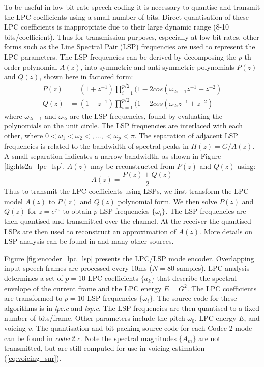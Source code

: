\documentclass{article}
\begin{document}
{To be useful in low bit rate speech coding it is necessary to quantise and transmit the LPC coefficients using a small number of bits. Direct quantisation of these LPC coefficients is inappropriate due to their large dynamic range (8-10 bits/coefficient). Thus for transmission purposes, especially at low bit rates, other forms such as the Line Spectral Pair (LSP) \cite{itakura1975line} frequencies are used to represent the LPC parameters. The LSP frequencies can be derived by decomposing the $p$-th order polynomial $A(z)$, into symmetric and anti-symmetric polynomials $P(z)$ and $Q(z)$, shown here in factored form:
\begin{equation}
\begin{split}
P(z) &= (1+z^{-1}) \prod_{i=1}^{p/2} (1 - 2cos(\omega_{2i-1} z^{-1} + z^{-2} ) \\
Q(z) &= (1-z^{-1}) \prod_{i=1}^{p/2} (1 - 2cos(\omega_{2i} z^{-1} + z^{-2} )
\end{split}
\end{equation}
where $\omega_{2i-1}$ and $\omega_{2i}$ are the LSP frequencies, found by evaluating the polynomials on the unit circle. The LSP frequencies are interlaced with each other, where $0<\omega_1 < \omega_2 <,..., < \omega_p < \pi$. The separation of adjacent LSP frequencies is related to the bandwidth of spectral peaks in $H(z)=G/A(z)$. A small separation indicates a narrow bandwidth, as shown in Figure \ref{fig:hts2a_lpc_lsp}. $A(z)$ may be reconstructed from $P(z)$ and $Q(z)$ using:
\begin{equation}
A(z) = \frac{P(z)+Q(z)}{2}
\end{equation}
Thus to transmit the LPC coefficients using LSPs, we first transform the LPC model $A(z)$ to $P(z)$ and $Q(z)$ polynomial form. We then solve $P(z)$ and $Q(z)$ for $z=e^{j \omega}$ to obtain $p$ LSP frequencies $\{\omega_i\}$. The LSP frequencies are then quantised and transmitted over the channel. At the receiver the quantised LSPs are then used to reconstruct an approximation of $A(z)$.  More details on LSP analysis can be found in \cite{rowe1997techniques} and many other sources.

Figure \ref{fig:encoder_lpc_lsp} presents the LPC/LSP mode encoder. Overlapping input speech frames are processed every 10ms ($N=80$ samples).  LPC analysis determines a set of $p=10$ LPC coefficients $\{a_k\}$ that describe the spectral envelope of the current frame and the LPC energy $E=G^2$. The LPC coefficients are transformed to $p=10$ LSP frequencies $\{\omega_i\}$. The source code for these algorithms is in \emph{lpc.c} and \emph{lsp.c}.  The LSP frequencies are then quantised to a fixed number of bits/frame.  Other parameters include the pitch $\omega_0$, LPC energy $E$, and voicing $v$.  The quantisation and bit packing source code for each Codec 2 mode can be found in \emph{codec2.c}.  Note the spectral magnitudes $\{A_m\}$ are not transmitted, but are still computed for use in voicing estimation (\ref{eq:voicing_snr}).

}
\end{document}
